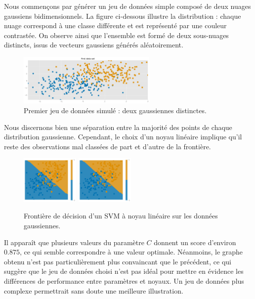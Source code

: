 \documentclass[12pt]{article}
\begin{document}
Nous commençons par générer un jeu de données simple composé de deux 
nuages gaussiens bidimensionnels. La figure ci-dessous illustre la 
distribution : chaque nuage correspond à une classe différente et 
est représenté par une couleur contrastée. 
On observe ainsi que l’ensemble est formé de deux sous-nuages 
distincts, issus de vecteurs gaussiens générés aléatoirement.

\begin{figure}[h!]
  \centering
  \includegraphics[width=0.6\textwidth]{images/gauss1.png}
  \caption{Premier jeu de données simulé : deux gaussiennes distinctes.}
\end{figure}
Nous discernons bien une séparation entre la majorité des points de 
chaque distribution gaussienne. Cependant, le choix d’un noyau linéaire 
implique qu’il reste des observations mal classées de part et d’autre 
de la frontière. 

\begin{figure}[h!]
  \centering
  \includegraphics[width=0.25\textwidth]{images/gauus2.png}
  \includegraphics[width=0.25\textwidth]{images/gauss3.png}
  \caption{Frontière de décision d’un SVM à noyau linéaire sur les données gaussiennes.}
\end{figure}

Il apparaît que plusieurs valeurs du paramètre $C$ donnent un score 
d’environ $0.875$, ce qui semble correspondre à une valeur optimale. 
Néanmoins, le graphe obtenu n’est pas particulièrement plus convaincant 
que le précédent, ce qui suggère que le jeu de données choisi n’est pas 
idéal pour mettre en évidence les différences de performance entre 
paramètres et noyaux. Un jeu de données plus complexe permettrait sans 
doute une meilleure illustration.
\end{document}
